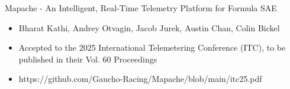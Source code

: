 \documentclass[9pt]{developercv} %
\begin{document}
\vspace{-16 pt}
\begin{entrylist}
    \entry
		{}
		{Mapache - An Intelligent, Real-Time Telemetry Platform for Formula SAE}
		{}
		{\vspace{-8pt}
        \begin{itemize}[noitemsep,topsep=0pt,parsep=0pt,partopsep=0pt, leftmargin=10pt]
            \item Bharat Kathi, Andrey Otvagin, Jacob Jurek, Austin Chan, Colin Bickel
            \item Accepted to the 2025 International Telemetering Conference (ITC), to be published in their Vol. 60 Proceedings
            \item https://github.com/Gaucho-Racing/Mapache/blob/main/itc25.pdf
        \end{itemize}}
\end{entrylist}
\end{document}
